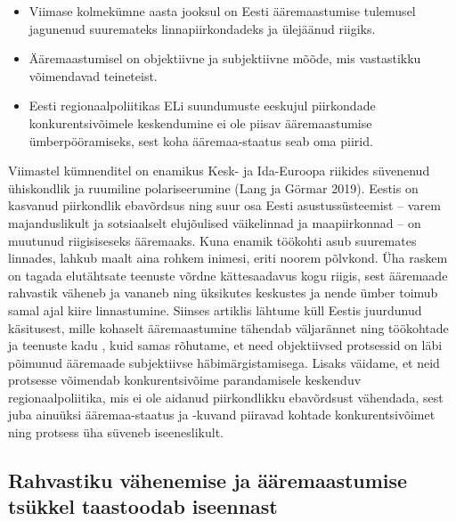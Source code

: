 \documentclass[]{book}
\begin{document}
\begin{points}
\begin{itemize}
\item
  Viimase kolmekümne aasta jooksul on Eesti ääremaastumise tulemusel
  jagunenud suuremateks linnapiirkondadeks ja ülejäänud riigiks.
\item
  Ääremaastumisel on objektiivne ja subjektiivne mõõde, mis vastastikku
  võimendavad teineteist.
\item
  Eesti regionaalpoliitikas ELi suundumuste eeskujul piirkondade
  konkurentsivõimele keskendumine ei ole piisav ääremaastumise
  ümberpööramiseks, sest koha ääremaa-staatus seab oma piirid.
\end{itemize}
\end{points}

Viimastel kümnenditel on enamikus Kesk- ja Ida-Euroopa riikides süvenenud ühiskondlik ja ruumiline
polariseerumine (Lang ja Görmar 2019). Eestis on kasvanud piirkondlik ebavõrdsus ning suur osa Eesti
asustussüsteemist -- varem majanduslikult ja sotsiaalselt elujõulised väikelinnad ja maapiirkonnad -- on
muutunud riigisiseseks ääremaaks. Kuna enamik töökohti asub suuremates linnades, lahkub maalt aina
rohkem inimesi, eriti noorem põlvkond. Üha raskem on tagada elutähtsate teenuste võrdne kättesaadavus
kogu riigis, sest ääremaade rahvastik väheneb ja vananeb ning üksikutes keskustes ja nende ümber toimub
samal ajal kiire linnastumine. Siinses artiklis lähtume küll Eestis juurdunud käsitusest, mille kohaselt
ääremaastumine tähendab väljarännet ning töökohtade ja teenuste kadu \autocite{koostookogu2010}, kuid
samas rõhutame, et need objektiivsed protsessid on läbi põimunud ääremaade subjektiivse
häbimärgistamisega. Lisaks väidame, et neid protsesse võimendab konkurentsivõime parandamisele
keskenduv regionaalpoliitika, mis ei ole aidanud piirkondlikku ebavõrdsust vähendada, sest juba ainuüksi
ääremaa-staatus ja -kuvand piiravad kohtade konkurentsivõimet ning protsess üha süveneb iseeneslikult.

\hypertarget{rahvastiku-vahenemise-ja-aaremaastumise-tsukkel-taastoodab-iseennast}{%
\subsection{Rahvastiku vähenemise ja ääremaastumise tsükkel taastoodab iseennast}\label{rahvastiku-vahenemise-ja-aaremaastumise-tsukkel-taastoodab-iseennast}}
\end{document}
